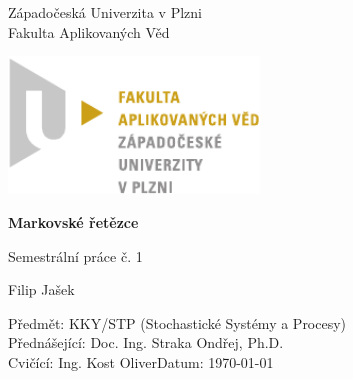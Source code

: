 \begin{titlepage}
    \begin{center}
        \LARGE
        Západočeská Univerzita v Plzni\\
        Fakulta Aplikovaných Věd\\
        
        \vspace{1cm}
        
        \includegraphics[width=0.5\textwidth]{./Graphics/FAV_logo.pdf}
        
        \vspace{4cm}
        
        \textbf{Markovské řetězce}
        
        \vspace{0.5cm}
        Semestrální práce č. 1
        
        \vspace{0.5cm}
        Filip Jašek
        
    \end{center} 
    \vfill
        \noindent
        \large
        Předmět: KKY/STP (Stochastické Systémy a Procesy)\\
        Přednášející: Doc. Ing. Straka Ondřej, Ph.D.\\
        Cvičící: Ing. Kost Oliver\hfill Datum: \today
\end{titlepage}